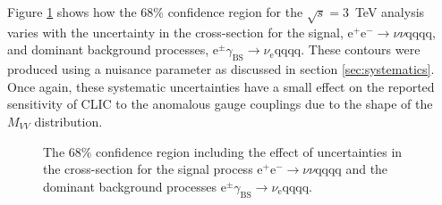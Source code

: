 Figure \ref{fig:nuisance3000GeV} shows how the 68\% confidence region for the $\sqrt{s}=3$~TeV analysis varies with the uncertainty in the cross-section for the signal, $\text{e}^{+}\text{e}^{-} \rightarrow \nu{\nu}\text{qqqq}$, and dominant background processes, $\text{e}^{\pm}\gamma_{\text{BS}} \rightarrow \nu_{\text{e}}\text{qqqq}$.  These contours were produced using a nuisance parameter as discussed in section \ref{sec:systematics}.  Once again, these systematic uncertainties have a small effect on the reported sensitivity of CLIC to the anomalous gauge couplings due to the shape of the $M_{VV}$ distribution.

\begin{figure}[h!]
\centering
{}\hfill
{}
\caption[The 68\% confidence region including the effect of uncertainties in the cross-section for \protect{} the signal process $\text{e}^{+}\text{e}^{-} \rightarrow \nu{\nu}\text{qqqq}$ and \protect{} the dominant background processes $\text{e}^{\pm}\gamma_{\text{BS}} \rightarrow \nu_{\text{e}}\text{qqqq}$.]{The 68\% confidence region including the effect of uncertainties in the cross-section for \protect{} the signal process $\text{e}^{+}\text{e}^{-} \rightarrow \nu{\nu}\text{qqqq}$ and \protect{} the dominant background processes $\text{e}^{\pm}\gamma_{\text{BS}} \rightarrow \nu_{\text{e}}\text{qqqq}$.}
\label{fig:nuisance3000GeV}
\end{figure}

